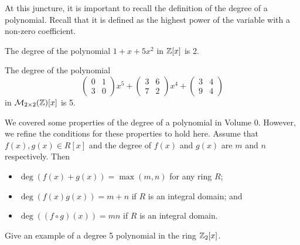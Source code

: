 At this juncture, it is important to recall the definition of the degree of a polynomial. Recall that it is defined as the highest power of the variable with a non-zero coefficient.
\begin{example}
    The degree of the polynomial $1+x+5x^2$ in $\mathbb{Z}[x]$ is 2.
\end{example}
\begin{example}
    The degree of the polynomial
    \[
        \begin{pmatrix}0&1\\3&0\end{pmatrix}x^5 + \begin{pmatrix}3&6\\7&2\end{pmatrix}x^4 + \begin{pmatrix}3&4\\9&4\end{pmatrix}
    \]
    in $\mathcal{M}_{2\times2}(\mathbb{Z})[x]$ is 5.
\end{example}
We covered some properties of the degree of a polynomial in Volume 0. However, we refine the conditions for these properties to hold here. Assume that $f(x), g(x) \in R[x]$ and the degree of $f(x)$ and $g(x)$ are $m$ and $n$ respectively. Then
\begin{itemize}
    \item $\deg(f(x) + g(x)) = \max(m, n)$ for any ring $R$;
    \item $\deg(f(x)g(x)) = m+n$ if $R$ is an integral domain; and
    \item $\deg((f\circ g)(x)) = mn$ if $R$ is an integral domain.
\end{itemize}

\begin{exercise}
    Give an example of a degree 5 polynomial in the ring $\mathbb{Z}_{2}[x]$.
\end{exercise}

